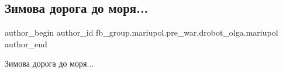  
 
 
 
 

\subsection{Зимова дорога до моря...}
\label{sec:05_02_2023.fb.fb_group.mariupol.pre_war.2.zimova_doroga_do_mor}
 
\ifcmt
 author_begin
   author_id fb_group.mariupol.pre_war,drobot_olga.mariupol
 author_end
\fi

Зимова дорога до моря...

